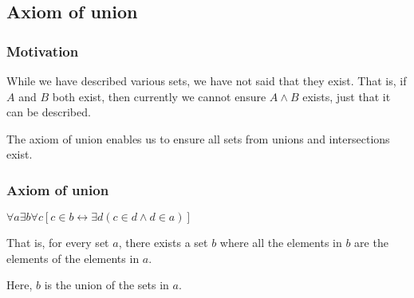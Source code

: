 
\subsection{Axiom of union}


\subsubsection{Motivation}

While we have described various sets, we have not said that they exist. That is, if \(A\) and \(B\) both exist, then currently we cannot ensure \(A\land B\) exists, just that it can be described.

The axiom of union enables us to ensure all sets from unions and intersections exist.

\subsubsection{Axiom of union}

$\forall a\exists b \forall c [c\in b\leftrightarrow \exists d(c\in d\land d\in a)]$

That is, for every set \(a\), there exists a set \(b\) where all the elements in \(b\) are the elements of the elements in \(a\).

Here, \(b\) is the union of the sets in \(a\).

